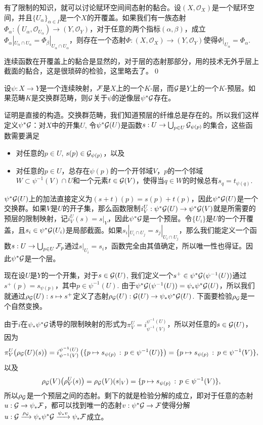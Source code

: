 \pro 有了限制的知识，就可以讨论赋环空间间态射的黏合。设$(X,\mathcal{O}_X)$是一个赋环空间，并且$\{U_\alpha\}_{\alpha\in I}$是一个$X$的开覆盖。如果我们有一族态射$\Phi_\alpha:(U_{\alpha},\mathcal{O}_{U_{\alpha}})\to (Y,\mathcal{O}_Y)$，对于任意的两个指标$(\alpha,\beta)$，成立$\Phi_\alpha|_{U_{\alpha}\cap U_{\alpha}}=\Phi_\beta|_{U_{\alpha}\cap U_{\alpha}}$，则存在一个态射$\Phi:(X,\mathcal{O}_{X})\to (Y,\mathcal{O}_Y)$使得$\Phi|_{U_{\alpha}}=\Phi_\alpha$.

\proof 连续函数在开覆盖上的黏合是显然的，对于层的态射那部分，用的技术无外乎层上截面的黏合，这是很琐碎的检验，这里略去了。\qed

\pro 设$\psi:X\to Y$是一个连续映射，$\mathcal{F}$是$X$上的一个$K$-层，而$\mathcal{G}$是$Y$上的一个$K$-预层。如果范畴$K$是交换群范畴，则$\mathcal{G}$关于$\psi$的逆像层$\psi^*\mathcal{G}$存在。

\proof 
	证明是直接的构造。交换群范畴，我们知道预层的纤维总是存在的。所以我们这样定义$\psi^*\mathcal{G}$：对$X$中的开集$U$, 令$\psi^*\mathcal{G}(U)$是函数$s:U\to \bigcup_{p\in U}\mathcal{G}_{\psi(p)}$的集合，这些函数需要满足
	\begin{itemize}
		\item 对任意的$p\in U$, $s(p)\in \mathcal{G}_{\psi(p)}$，以及

		\item 对任意的$p\in U$，总存在$\psi(p)$的一个开邻域$V$，$p$的一个邻域$W\subset \psi^{-1}(V)\cap U$和一个元素$t\in \mathcal{G}(V)$，使得当$q\in W$的时候总有$s_q=t_{\psi(q)}$.
	\end{itemize}

	$\psi^*\mathcal{G}(U)$上的加法直接定义为$(s+t)(p)=s(p)+t(p)$，因此$\psi^*\mathcal{G}(U)$是一个交换群。如果$V$是$U$的开子集，那么函数限制$i^U_V:\psi^*\mathcal{G}(U)\to \psi^*\mathcal{G}(V)$就是所需要的预层的限制映射，记$i^U_V(s)=s|_V$，因此$\psi^*\mathcal{G}$是一个预层。令$\{U_i\}$是$U$的一个开覆盖，且$s_i\in \psi^*\mathcal{G}(U_i)$是局部截面。如果$s_i|_{U_i\cap U_j}=s_j|_{U_i\cap U_j}$，那么我们能定义一个函数$s:U\to \bigcup_{p\in U}\mathcal{F}_p$通过$s|_{U_i}=s_i$，函数完全由其值确定，所以唯一性也得证。因此$\psi^*\mathcal{G}$是一个层。

	现在设$U$是$Y$的一个开集，对于$s\in \mathcal{G}(U)$, 我们定义一个$s^+\in \psi^*\mathcal{G}(\psi^{-1}(U))$通过$s^+(p)=s_{\psi(p)}$，其中$p\in \psi^{-1}(U)$. 由于$\psi^*\mathcal{G}(\psi^{-1}(U))=\psi_*\psi^*\mathcal{G}(U)$，所以我们就通过$\rho_{\mathcal{G}}(U):s\mapsto s^+$定义了态射$\rho_{\mathcal{G}}(U):\mathcal{G}(U)\to \psi_*\psi^*\mathcal{G}(U)$. 下面要检验$\rho_{\mathcal{G}}$是一个自然变换。

	由于$i$在$\psi_*\psi^*\mathcal{G}$诱导的限制映射的形式为$\pi^U_V=i^{\psi^{-1}(U)}_{\psi^{-1}(V)}$，所以对任意的$s\in \mathcal{G}(U)$，因为
	\[
		\pi^U_V\bigl(\rho_{\mathcal{G}}(U)(s)\bigr)=i^{\psi^{-1}(U)}_{\psi^{-1}(V)}\left(\{p\mapsto s_{\psi(p)}\,:\, p\in \psi^{-1}(U)\}\right)=\{p\mapsto s_{\psi(p)}\,:\, p\in \psi^{-1}(V)\},
	\]
	以及
	\[
		\rho_{\mathcal{G}}(V)\bigl(\rho^U_V(s)\bigr)=\rho_{\mathcal{G}}(V)(s|_V)=\{p\mapsto s_{\psi(p)}\,:\, p\in \psi^{-1}(V)\},
	\]
	所以$\rho_{\mathcal{G}}$是一个预层之间的态射。剩下的就是检验分解的成立，即对于任意的态射$u:\mathcal{G} \to \psi_*\mathcal{F}$，都可以找到唯一的态射$v:\psi^*\mathcal{G} \to \mathcal{F}$使得分解$u:\mathcal{G}\xrightarrow{\rho_{\mathcal{G}}} \psi_*\psi^*\mathcal{G} \xrightarrow{\psi_*v} \psi_*\mathcal{F}$成立。

